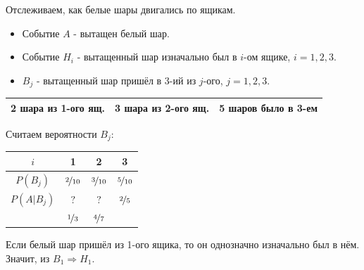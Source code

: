 Отслеживаем, как белые шары двигались по ящикам.

\begin{itemize}
	\item Событие $A$ - вытащен белый шар. 
	\item Событие $H_i$ - вытащенный шар изначально был в $i$-ом ящике, $i=1,2,3$.
	\item $B_j$ - вытащенный шар пришёл в 3-ий из $j$-ого, $j=1,2,3$.
\end{itemize}

\begin{table}[h]
	\centering
	\begin{tabular}{|c|c|c|}
		2 шара из 1-ого ящ. & 3 шара из 2-ого ящ. & 5 шаров было в 3-ем \\ \hline
	\end{tabular}
\end{table}

Считаем вероятности $B_j$: 

\begin{table}[h]
	\centering
	\begin{tabular}{cccc}
		\hline
		\multicolumn{1}{|c|}{$i$}        & \multicolumn{1}{c|}{1}              	   & \multicolumn{1}{c|}{2}                  & \multicolumn{1}{c|}{3}              \\ \hline
		\multicolumn{1}{|c|}{$P(B_j)$}   & \multicolumn{1}{c|}{$\nicefrac{2}{10}$} & \multicolumn{1}{c|}{$\nicefrac{3}{10}$} & \multicolumn{1}{c|}{$\nicefrac{5}{10}$} \\ \hline
		\multicolumn{1}{|c|}{$P(A|B_j)$} & \multicolumn{1}{c|}{$?$}                & \multicolumn{1}{c|}{$?$}                & \multicolumn{1}{c|}{$\nicefrac{2}{5}$}  \\ \hline
		& $\nicefrac{1}{3}$              &  $\nicefrac{4}{7}$                      &                                    
	\end{tabular}
\end{table}

Если белый шар пришёл из 1-ого ящика, то он однозначно изначально был в нём. Значит, из $B_1 \Rightarrow H_1$.

\begin{figure}[H]
\end{figure}

